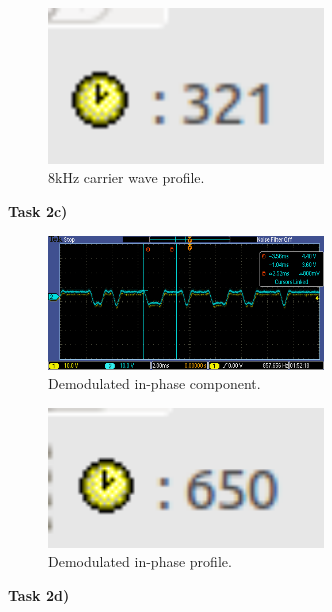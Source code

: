 \documentclass{article}
\begin{document}
\begin{figure}[h]
  \begin{center}
    \includegraphics[width=0.65\textwidth]{img/task_2_b_profile.png}
    \caption{8kHz carrier wave profile.}
  \end{center}
\end{figure}

\pagebreak
\textbf{Task 2c)}

\begin{figure}[h]
  \begin{center}
    \includegraphics[width=0.65\textwidth]{img/task_2_c_oscilloscope.png}
    \caption{Demodulated in-phase component.}
  \end{center}
\end{figure}

\begin{figure}[h]
  \begin{center}
    \includegraphics[width=0.65\textwidth]{img/task_2_c_profile.png}
    \caption{Demodulated in-phase profile.}
  \end{center}
\end{figure}

\pagebreak
\textbf{Task 2d)}
\end{document}
